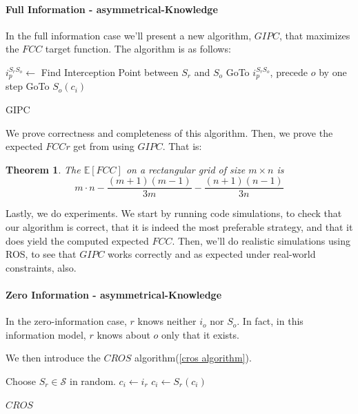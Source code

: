 \documentclass[a4paper,english,10pt]{article}
\newtheorem{theorem}{Theorem}[section]
\newcommand\rob{\ensuremath{r}\xspace}
\newcommand\opp{\ensuremath{o}\xspace}
\newcommand{\fcc}{\ensuremath{FCC}\xspace}
\newcommand{\cros}{\ensuremath{CROS}\xspace}
\begin{document}
\paragraph{Full Information - asymmetrical-Knowledge}

In the full information case we'll present a new algorithm, $GIPC$, that maximizes the \fcc target function.
The algorithm is as follows:
\begin{algorithm}
\begin{algorithmic}
	\STATE $i_p^{S_\rob S_\opp} \leftarrow $ Find Interception Point between $S_\rob$ and $S_\opp$
    \STATE GoTo $i_p^{S_\rob S_\opp}$, precede \opp by one step
    \LOOP
        	\STATE GoTo $S_\opp(c_i)$
        \ENDIF
    \ENDLOOP
  
\end{algorithmic}
\caption{GIPC\label{lss}}
\end{algorithm}

We prove correctness and completeness of this algorithm. Then, we prove the expected \fcc \rob get from using $GIPC$. That is:
\begin{theorem}
The $\mathbb{E}[\fcc]$ on a rectangular grid of size $m\times n$ is \[m\cdot n-\frac{\left(m+1\right)\left(m-1\right)}{3m}-\frac{\left(n+1\right)\left(n-1\right)}{3n}\] 
\end{theorem}

Lastly, we do experiments. We start by running code simulations, to check that our algorithm is correct, that it is indeed the most preferable strategy, and that it does yield the computed expected \fcc.
Then, we'll do realistic simulations using ROS, to see that $GIPC$ works correctly and as expected under real-world constraints, also.

\paragraph{Zero Information - asymmetrical-Knowledge}
In the zero-information case, \rob knows neither $i_\opp$ nor $S_\opp$. In fact, in this information model, \rob knows about \opp only that it exists.

We then introduce the \cros algorithm(\ref{cros algorithm}). 
\begin{algorithm}
\begin{algorithmic}
	\STATE Choose $S_\rob \in \mathcal{S}$ in random.
    \STATE $c_i \leftarrow i_\rob$
    \LOOP
    	\STATE $c_i \leftarrow S_\rob(c_i)$
    \ENDLOOP
  
\end{algorithmic}
\caption{\cros\label{cros algorithm}}
\end{algorithm}
\end{document}
